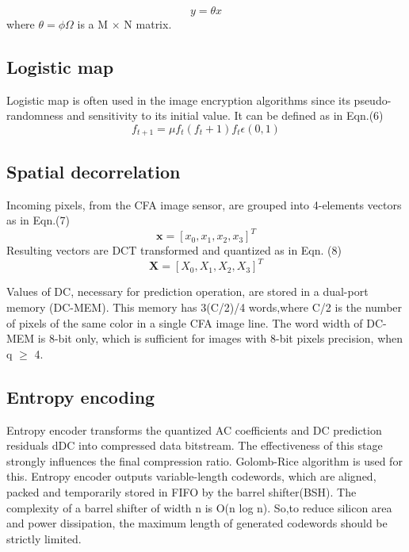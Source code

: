 \documentclass[10pt,a4paper,journal]{IEEEtran}
\begin{document}
\begin{equation}
y = \theta x
\end{equation}
where $ \theta = \phi \Omega$ is a M $ \times $ N matrix.

\subsection{Logistic map}
\hspace*{2em}Logistic map is often used in the image encryption algorithms \cite{} since
its pseudo-randomness and sensitivity to its initial value. It can be defined as in Eqn.(6)\cite{4}
\begin{equation}
f_{t+1} = \mu f_{t}(f_{t} + 1) f_{t} \epsilon (0,1)
\end{equation}

\subsection{Spatial decorrelation}
Incoming pixels, from the CFA image sensor, are grouped into 4-elements vectors as in Eqn.(7)\cite{8}\\
\begin{equation}
\textbf{x}=[x_{0},x_{1},x_{2},x_{3}]^{T}
\end{equation}
Resulting vectors are DCT transformed and quantized as in Eqn. (8)\cite{8}
\begin{equation}
\textbf{X}=[X_{0},X_{1},X_{2},X_{3}]^{T}
\end{equation}

Values of DC\cite{6}, necessary for prediction operation\cite{7}, are stored in a dual-port memory (DC-MEM). This memory has 3(C/2)/4 words,where C/2 is the number of pixels of the same color in a single CFA image line. The word width of DC-MEM is 8-bit only, which is sufficient for images with 8-bit pixels precision, when q $\geq$ 4.

\subsection{Entropy encoding}
\hspace*{2em} Entropy encoder transforms the quantized AC coefficients and \cite{8} DC prediction residuals dDC into compressed data bitstream. The effectiveness of this stage strongly influences the final compression ratio. Golomb-Rice algorithm is used for this. Entropy encoder outputs variable-length codewords, which are aligned, packed and temporarily stored in FIFO by the barrel shifter(BSH). The complexity of a barrel shifter of width n is O(n log n). So,to reduce silicon area and power dissipation, the maximum length of generated codewords should be strictly limited.
\end{document}

